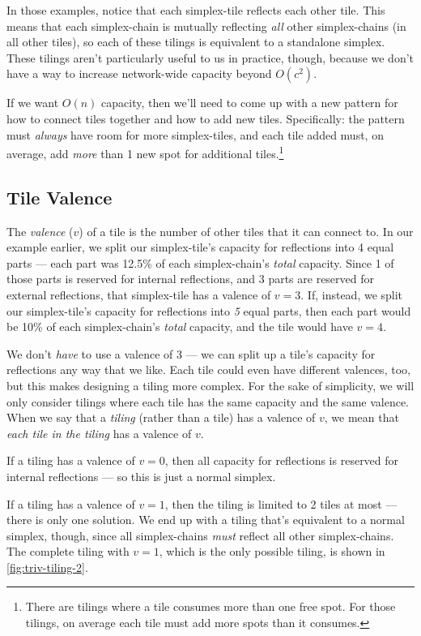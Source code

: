 In those examples, notice that each simplex-tile reflects each other tile.
This means that each simplex-chain is mutually reflecting \emph{all} other simplex-chains (in all other tiles), so each of these tilings is equivalent to a standalone simplex.
These tilings aren't particularly useful to us in practice, though, because we don't have a way to increase network-wide capacity beyond $O(c^2)$.

If we want $O(n)$ capacity, then we'll need to come up with a new pattern for how to connect tiles together and how to add new tiles.
Specifically: the pattern must \emph{always} have room for more simplex-tiles, and each tile added must, on average, add \emph{more} than 1 new spot for additional tiles.\footnote{
    There are tilings where a tile consumes more than one free spot.
    For those tilings, on average each tile must add more spots than it consumes.
}

\subsection{Tile Valence}

The \emph{valence} ($v$) of a tile is the number of other tiles that it can connect to.
In our example earlier, we split our simplex-tile's capacity for reflections into 4 equal parts --- each part was 12.5\% of each simplex-chain's \emph{total} capacity.
Since 1 of those parts is reserved for internal reflections, and 3 parts are reserved for external reflections, that simplex-tile has a valence of $v=3$.
If, instead, we split our simplex-tile's capacity for reflections into \emph{5} equal parts, then each part would be 10\% of each simplex-chain's \emph{total} capacity, and the tile would have $v=4$.

We don't \emph{have} to use a valence of 3 --- we can split up a tile's capacity for reflections any way that we like.
Each tile could even have different valences, too, but this makes designing a tiling more complex.
For the sake of simplicity, we will only consider tilings where each tile has the same capacity and the same valence.
When we say that a \emph{tiling} (rather than a tile) has a valence of $v$, we mean that \emph{each tile in the tiling} has a valence of $v$.

If a tiling has a valence of $v=0$, then all capacity for reflections is reserved for internal reflections --- so this is just a normal simplex.

If a tiling has a valence of $v=1$, then the tiling is limited to 2 tiles at most --- there is only one solution.
We end up with a tiling that's equivalent to a normal simplex, though, since all simplex-chains \emph{must} reflect all other simplex-chains.
The complete tiling with $v=1$, which is the only possible tiling, is shown in \autoref{fig:triv-tiling-2}.

